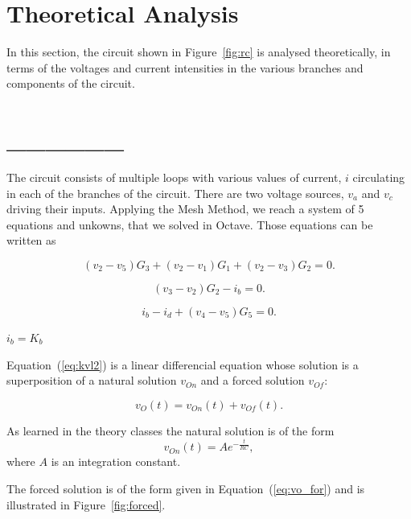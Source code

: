 \section{Theoretical Analysis}
\label{sec:analysis}

In this section, the circuit shown in Figure~\ref{fig:rc} is analysed
theoretically, in terms of the voltages and current intensities in the various branches and components of the circuit.

\section{______}

The circuit consists of multiple loops with various values of current, $i$ circulating in each of the branches of the circuit. There are two
voltage sources, $v_a$ and $v_c$ driving their inputs. Applying the Mesh Method, we reach a system of 5 equations and unkowns, that we solved in Octave. Those equations can be written as

\begin{equation}
  (v_2 - v_5)G_3 + (v_2 - v_1)G_1 + (v_2 - v_3)G_2 = 0.
  \label{eq:kvl}
\end{equation}

\begin{equation}
  (v_3 - v_2)G_2 - i_b = 0.
\end{equation}

\begin{equation}
  i_b - i_d + (v_4 - v_5)G_5 = 0.
  \label{eq:kvl2}
\end{equation}

$i_b = K_b$

Equation~(\ref{eq:kvl2}) is a linear differencial equation whose solution is a
superposition of a natural solution $v_{On}$ and a forced solution $v_{Of}$:

\begin{equation}
  v_O(t) = v_{On}(t) + v_{Of}(t).
  \label{eq:vo_sol}
\end{equation}

As learned in the theory classes the natural solution is of the form
\begin{equation}
  v_{On}(t) = Ae^{-\frac{t}{RC}},
  \label{eq:vo_nat}
\end{equation}
where $A$ is an integration constant.

The forced solution is of the form given in Equation~(\ref{eq:vo_for}) and is
illustrated in Figure~\ref{fig:forced}.


